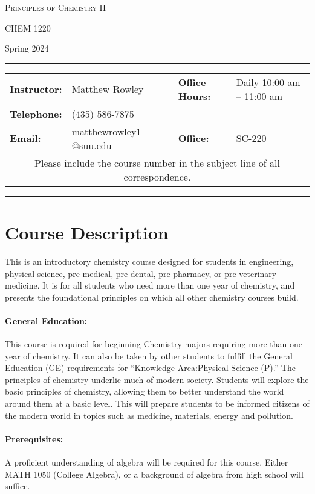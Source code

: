 \documentclass[12pt, letterpaper]{article}
\begin{document}
\begin{center}
	{\Large \textsc{Principles of Chemistry II}}

	CHEM 1220
\end{center}

\begin{center}
	{\large Spring 2024}
\end{center}
\begin{center}
	\rule{0.99\textwidth}{0.4pt}
	\begin{tabular}{llcll}
		\textbf{Instructor:} & Matthew Rowley           &  & \textbf{Office Hours:} & Daily 10:00 am -- 11:00 am \\
		\textbf{Telephone:}  & (435) 586-7875           &  &                        &                            \\
		\textbf{Email:}      & matthewrowley$1$@suu.edu &  & \textbf{Office:}       & SC-220                     \\
		\multicolumn{5}{c}{Please include the course number in the subject line of all correspondence.}
	\end{tabular}
	\rule{0.99\textwidth}{0.4pt}
\end{center}

\section*{Course Description}
This is an introductory chemistry course designed for students in engineering, physical science, pre-medical, pre-dental, pre-pharmacy, or pre-veterinary medicine. It is for all students who need more than one year of chemistry, and presents the foundational principles on which all other chemistry courses build.

\paragraph{General Education:}
This course is required for beginning Chemistry majors requiring more than one year of chemistry. It can also be taken by other students to fulfill the General Education (GE) requirements for ``Knowledge Area:Physical Science (P).'' The principles of chemistry underlie much of modern society. Students will explore the basic principles of chemistry, allowing them to better understand the world around them at a basic level. This will prepare students to be informed citizens of the modern world in topics such as medicine, materials, energy and pollution.

\paragraph{Prerequisites:}
A proficient understanding of algebra will be required for this course. Either MATH 1050 (College Algebra), or a background of algebra from high school will suffice.
\end{document}
